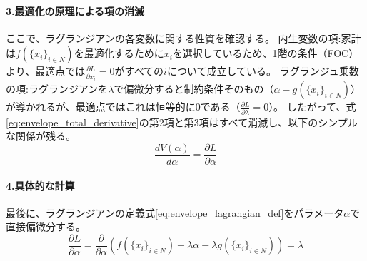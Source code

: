 \paragraph{3.最適化の原理による項の消滅}
ここで、ラグランジアンの各変数に関する性質を確認する。
内生変数の項:家計は\(f(\{x_i\}_{i\in N})\)を最適化するために\(x_i\)を選択しているため、1階の条件（FOC）より、最適点では\(\frac{\partial L}{\partial x_i}=0\)がすべての\(i\)について成立している。
ラグランジュ乗数の項:ラグランジアンを\(\lambda\)で偏微分すると制約条件そのもの（\(\alpha-g(\{x_i\}_{i\in N})\)）が導かれるが、最適点ではこれは恒等的に0である（\(\frac{\partial L}{\partial \lambda}=0\)）。
したがって、式\eqref{eq:envelope_total_derivative}の第2項と第3項はすべて消滅し、以下のシンプルな関係が残る。
\begin{equation}
\label{eq:envelope_result}
    \frac{dV(\alpha)}{d\alpha}=\frac{\partial L}{\partial \alpha}
\end{equation}

\paragraph{4.具体的な計算}
最後に、ラグランジアンの定義式\eqref{eq:envelope_lagrangian_def}をパラメータ\(\alpha\)で直接偏微分する。
\begin{equation}
\label{eq:envelope_final_step}
    \frac{\partial L}{\partial \alpha}=\frac{\partial}{\partial \alpha}\left(f(\{x_i\}_{i\in N})+\lambda\alpha-\lambda g(\{x_i\}_{i\in N})\right)=\lambda
\end{equation}